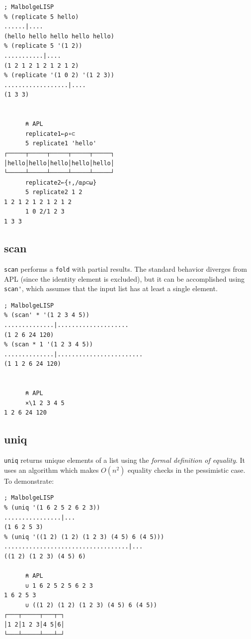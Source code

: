 \begin{verbatim}
; MalbolgeLISP
% (replicate 5 hello)
......|....
(hello hello hello hello hello)
% (replicate 5 '(1 2))
...........|....
(1 2 1 2 1 2 1 2 1 2)
% (replicate '(1 0 2) '(1 2 3))
..................|....
(1 3 3)


      ⍝ APL
      replicate1←⍴∘⊂
      5 replicate1 'hello'
┌─────┬─────┬─────┬─────┬─────┐
│hello│hello│hello│hello│hello│
└─────┴─────┴─────┴─────┴─────┘
      replicate2←{↑,/⍺⍴⊂⍵}
      5 replicate2 1 2
1 2 1 2 1 2 1 2 1 2
      1 0 2/1 2 3
1 3 3
\end{verbatim}

\subsection{scan}

\par \verb|scan| performs a \verb|fold| with partial results. The standard behavior diverges from APL (since the identity element is excluded), but it can be accomplished using \verb|scan'|, which assumes that the input list has at least a single element.

\begin{verbatim}
; MalbolgeLISP
% (scan' * '(1 2 3 4 5))
..............|....................
(1 2 6 24 120)
% (scan * 1 '(1 2 3 4 5))
..............|........................
(1 1 2 6 24 120)


      ⍝ APL
      ×\1 2 3 4 5
1 2 6 24 120
\end{verbatim}

\subsection{uniq}

\par \verb|uniq| returns unique elements of a list using the \textit{formal definition of equality}. It uses an algorithm which makes $O(n^2)$ equality checks in the pessimistic case. To demonstrate:

\begin{verbatim}
; MalbolgeLISP
% (uniq '(1 6 2 5 2 6 2 3))
................|...
(1 6 2 5 3)
% (uniq '((1 2) (1 2) (1 2 3) (4 5) 6 (4 5)))
...................................|...
((1 2) (1 2 3) (4 5) 6)

      ⍝ APL
      ∪ 1 6 2 5 2 5 6 2 3
1 6 2 5 3
      ∪ ((1 2) (1 2) (1 2 3) (4 5) 6 (4 5))
┌───┬─────┬───┬─┐
│1 2│1 2 3│4 5│6│
└───┴─────┴───┴─┘
\end{verbatim}

